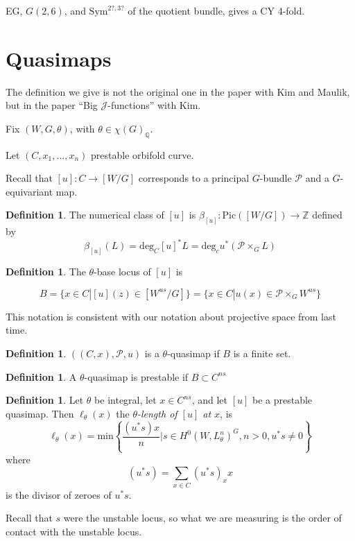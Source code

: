 \documentclass{amsart}
\theoremstyle{definition}
\newtheorem{definition}[dummy]{Definition}
\newcommand{\Pic}{\text{Pic}}
\newcommand{\Z}{\mathbb{Z}}
\newcommand{\J}{\mathcal{J}}
\newcommand{\Q}{\mathbb{Q}}
\begin{document}
EG, $G(2,6)$, and $\text{Sym}^{2?, 3?}$ of the quotient bundle, gives a CY 4-fold.

\section{Quasimaps}

The definition we give is not the original one in the paper with Kim and Maulik, but in the paper ``Big $\J$-functions'' with Kim.

Fix $(W, G, \theta)$, with $\theta\in\chi(G)_\Q$.

Let $(C,x_1,\dots, x_n)$ prestable orbifold curve.

Recall that $[u]:C\to [W/G]$ corresponds to a principal $G$-bundle $\mathcal{P}$ and a $G$-equivariant map.

\begin{definition}
The numerical class of $[u]$ is $\beta_{[u]}:\Pic([W/G])\to\Z$ defined by
$$\beta_{[u]}(L)=\text{deg}_C [u]^* L=\text{deg}_cu^*(\mathcal{P}\times_G L)$$
\end{definition}

\begin{definition}
The $\theta$-base locus of $[u]$ is

$$B=\{x\in C|[u](z)\in[W^{us}/G]\}=\{x\in C|u(x)\in\mathcal{P}\times_G W^{us}\}$$ 
\end{definition}

This notation is consistent with our notation about projective space from last time.

\begin{definition}
$\left((C,x),\mathcal{P},u\right)$ is a $\theta$-quasimap if $B$ is a finite set.
\end{definition}

\begin{definition}
A $\theta$-quasimap is prestable if $B\subset C^{ns}$
\end{definition}

\begin{definition}
Let $\theta$ be integral, let $x\in C^{ns}$, and let $[u]$ be a prestable quasimap.  Then $\ell_\theta(x)$ the \emph{$\theta$-length of $[u]$ at $x$}, is
$$\ell_{\theta}(x)=\text{min}\left\{\frac{(u^*s)x}{n}|s\in H^0(W, L^n_{\theta})^G, n>0, u^*s\neq 0\right\}$$
where
$$(u^*s)=\sum_{x\in C} (u^*s)_x x$$
is the divisor of zeroes of $u^*s$.

\end{definition}
Recall that $s$ were the unstable locus, so what we are measuring is the order of contact with the unstable locus.
\end{document}
